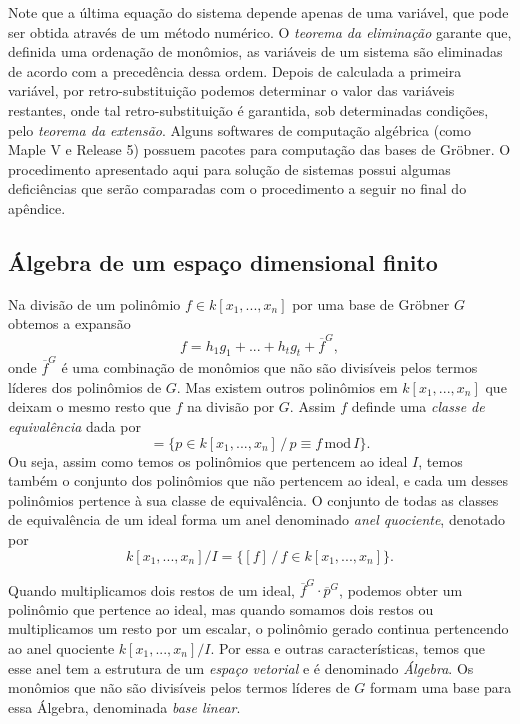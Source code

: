 Note que a última equação do sistema depende apenas de uma variável, que pode ser obtida através de um método numérico. O {\it teorema da eliminação} garante que, definida uma ordenação de monômios, as variáveis de um sistema são eliminadas de acordo com a precedência dessa ordem. Depois de calculada a primeira variável, por retro-substituição podemos determinar o valor das variáveis restantes, onde tal retro-substituição é garantida, sob determinadas condições, pelo {\it teorema da extensão}. Alguns softwares de computação algébrica (como Maple V e Release 5) possuem pacotes para computação das bases de Gr\"obner. O procedimento apresentado aqui para solução de sistemas possui algumas deficiências que serão comparadas com o procedimento a seguir no final do apêndice.

\subsection*{Álgebra de um espaço dimensional finito}

Na divisão de um polinômio $f\in k[x_1,...,x_n]$ por uma base de Gr\"obner $G$ obtemos a expansão
\begin{equation*}
f=h_1g_1+...+h_tg_t+\overline{f}^G,
\end{equation*} 
onde $\overline{f}^G$ é uma combinação de monômios que não são divisíveis pelos termos líderes dos polinômios de $G$. Mas existem outros polinômios em $k[x_1,...,x_n]$ que deixam o mesmo resto que $f$ na divisão por $G$. Assim $f$ definde uma {\it classe de equivalência} dada por
\begin{equation*}
[f]=\{p\in k[x_1,...,x_n]\,/\,p\equiv f\, \text{mod}\, I\}.
\end{equation*}
Ou seja, assim como temos os polinômios que pertencem ao ideal $I$, temos também o conjunto dos polinômios que não pertencem ao ideal, e cada um desses polinômios pertence à sua classe de equivalência. O conjunto de todas as classes de equivalência de um ideal forma um anel denominado {\it anel quociente}, denotado por
\begin{equation*}
k[x_1,...,x_n]/I=\{[f]\,/\,f\in k[x_1,...,x_n]\}.
\end{equation*}

Quando multiplicamos dois restos de um ideal, $\overline{f}^G\cdot\overline{p}^G$, podemos obter um polinômio que pertence ao ideal, mas quando somamos dois restos ou multiplicamos um resto por um escalar, o polinômio gerado continua pertencendo ao anel quociente $k[x_1,...,x_n]/I$. Por essa e outras características, temos que esse anel tem a estrutura de um {\it espaço vetorial} e é denominado {\it Álgebra}. Os monômios que não são divisíveis pelos termos líderes de $G$ formam uma base para essa Álgebra, denominada {\it base linear}. 

